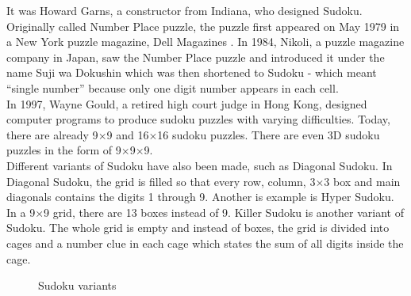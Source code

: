 \documentclass[a4paper,oneside,11pt]{report}
\begin{document}
It was Howard Garns, a constructor from Indiana, who designed Sudoku. Originally called Number Place puzzle, the puzzle first appeared on May 1979 in a New York puzzle magazine, Dell Magazines \cite{Wilson}. In 1984, Nikoli, a puzzle magazine company in Japan, saw the Number Place puzzle and introduced it under the name Suji wa Dokushin which was then shortened to Sudoku - which meant “single number” because only one digit number appears in each cell.\\

In 1997, Wayne Gould, a retired high court judge in Hong Kong, designed computer programs to produce sudoku puzzles with varying difficulties. Today, there are already 9$\times$9 and 16$\times$16 sudoku puzzles. There are even 3D sudoku puzzles in the form of 9$\times$9$\times$9.\\

Different variants of Sudoku have also been made, such as Diagonal Sudoku. In Diagonal Sudoku, the grid is filled so that every row, column, 3$\times$3 box and main diagonals contains the digits 1 through 9. Another is example is Hyper Sudoku. In a 9$\times$9 grid, there are 13 boxes instead of 9. Killer Sudoku is another variant of Sudoku. The whole grid is empty and instead of boxes, the grid is divided into cages and a number clue in each cage which states the sum of all digits inside the cage.\\

\begin{figure}[h]
  \centering
  \hspace{0.5cm}
  \hspace{0.5cm}
  \caption{Sudoku variants}
\end{figure}
\end{document}
